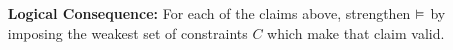 \documentclass[a4paper, 11pt]{article} %
\begin{document}
\begin{enumerate}[leftmargin=1.2in]
\begin{enumerate}[label=\arabic*.,resume]
    \end{enumerate}
  \item[\bf Logical Consequence:] For each of the claims above, strengthen $\MLmodels[]$ by imposing the weakest set of constraints $C$ which make that claim valid. 

\end{enumerate}
\end{document}
